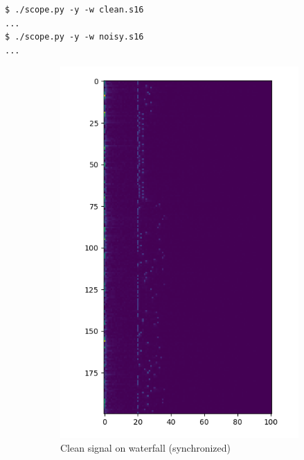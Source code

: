 \documentclass[a4paper]{article}
\begin{document}
\begin{lstlisting}
$ ./scope.py -y -w clean.s16
...
$ ./scope.py -y -w noisy.s16
...
\end{lstlisting}

\begin{figure}[H]
    \centering
    \begin{subfigure}[b]{0.45\textwidth}
        \includegraphics[width=1\textwidth]{waterfall_sync_clean.png}
        \caption{\label{fig:dft_clean}Clean signal on waterfall (synchronized)}
    \end{subfigure}
    \begin{subfigure}[b]{0.45\textwidth}

\end{subfigure}
\end{figure}
\end{document}
